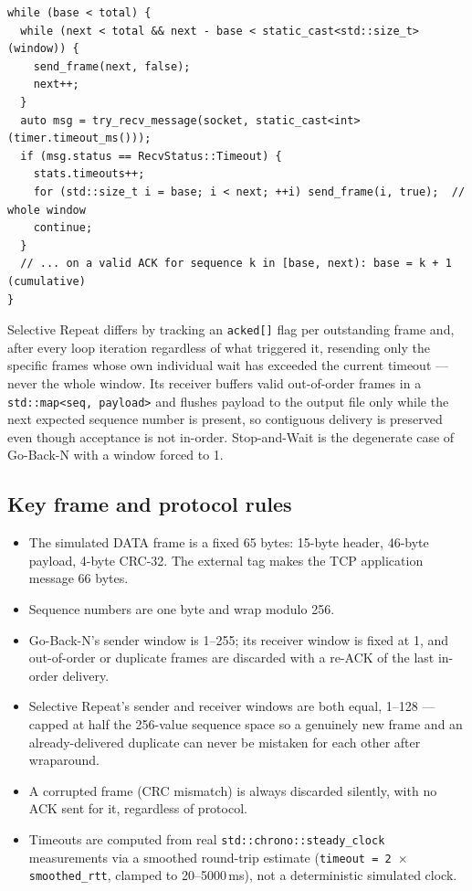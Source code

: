 \documentclass[11pt]{article}
\begin{document}
\begin{lstlisting}
while (base < total) {
  while (next < total && next - base < static_cast<std::size_t>(window)) {
    send_frame(next, false);
    next++;
  }
  auto msg = try_recv_message(socket, static_cast<int>(timer.timeout_ms()));
  if (msg.status == RecvStatus::Timeout) {
    stats.timeouts++;
    for (std::size_t i = base; i < next; ++i) send_frame(i, true);  // whole window
    continue;
  }
  // ... on a valid ACK for sequence k in [base, next): base = k + 1 (cumulative)
}
\end{lstlisting}

Selective Repeat differs by tracking an \texttt{acked[]} flag per outstanding frame and, after every
loop iteration regardless of what triggered it, resending only the specific frames whose own
individual wait has exceeded the current timeout --- never the whole window. Its receiver buffers
valid out-of-order frames in a \texttt{std::map<seq, payload>} and flushes payload to the output
file only while the next expected sequence number is present, so contiguous delivery is preserved
even though acceptance is not in-order. Stop-and-Wait is the degenerate case of Go-Back-N with a
window forced to 1.

\subsection{Key frame and protocol rules}
\begin{itemize}[nosep]
    \item The simulated DATA frame is a fixed 65 bytes: 15-byte header, 46-byte payload, 4-byte CRC-32.
          The external tag makes the TCP application message 66 bytes.
    \item Sequence numbers are one byte and wrap modulo 256.
    \item Go-Back-N's sender window is 1--255; its receiver window is fixed at 1, and out-of-order or
          duplicate frames are discarded with a re-ACK of the last in-order delivery.
    \item Selective Repeat's sender and receiver windows are both equal, 1--128 --- capped at half the
          256-value sequence space so a genuinely new frame and an already-delivered duplicate can never
          be mistaken for each other after wraparound.
    \item A corrupted frame (CRC mismatch) is always discarded silently, with no ACK sent for it,
          regardless of protocol.
    \item Timeouts are computed from real \texttt{std::chrono::steady\_clock} measurements via a
          smoothed round-trip estimate (\texttt{timeout = 2 $\times$ smoothed\_rtt}, clamped to
          20--5000\,ms), not a deterministic simulated clock.
\end{itemize}
\end{document}
